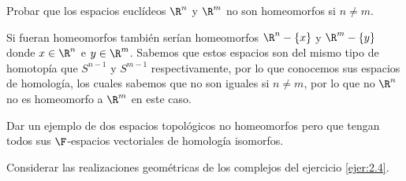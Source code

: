 \documentclass[twoside]{article}
\begin{document}
\begin{solucion}
\end{solucion}

\newpage

\begin{ejercicio}{2.22}
Probar que los espacios euclídeos $\R^n$
y $\R^m$ no son homeomorfos si $n\neq m$.
\end{ejercicio}
\begin{solucion}
Si fueran homeomorfos también serían homeomorfos $\R^n-\{x\}$ y $\R^m-\{y\}$ donde $x\in\R^n$ e $y\in\R^m$. Sabemos que estos espacios son del mismo tipo de homotopía que $S^{n-1}$ y $S^{m-1}$ respectivamente, por lo que conocemos sus espacios de homología, los cuales sabemos que no son iguales si $n\neq m$, por lo que no $\R^n$ no es homeomorfo a $\R^m$ en este caso.
\end{solucion}
\newpage

\begin{ejercicio}{2.23}
Dar un ejemplo de dos espacios topológicos no homeomorfos pero que
tengan todos sus $\F$-espacios vectoriales de homología isomorfos.
\end{ejercicio}
\begin{solucion}
Considerar las realizaciones geométricas de los complejos del ejercicio \ref{ejer:2.4}.
\end{solucion}
\end{document}

